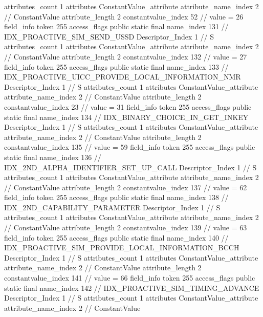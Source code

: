 {{{{{				attributes_count	1
				attributes {
				ConstantValue_attribute {
					attribute_name_index	2		// ConstantValue
					attribute_length	2
					constantvalue_index	52		// value = 26
				}
				}
			}
			field_info {
				token	255
				access_flags	public static final
				name_index	131		// IDX_PROACTIVE_SIM_SEND_USSD
				Descriptor_Index	1		// S
				attributes_count	1
				attributes {
				ConstantValue_attribute {
					attribute_name_index	2		// ConstantValue
					attribute_length	2
					constantvalue_index	132		// value = 27
				}
				}
			}
			field_info {
				token	255
				access_flags	public static final
				name_index	133		// IDX_PROACTIVE_UICC_PROVIDE_LOCAL_INFORMATION_NMR
				Descriptor_Index	1		// S
				attributes_count	1
				attributes {
				ConstantValue_attribute {
					attribute_name_index	2		// ConstantValue
					attribute_length	2
					constantvalue_index	23		// value = 31
				}
				}
			}
			field_info {
				token	255
				access_flags	public static final
				name_index	134		// IDX_BINARY_CHOICE_IN_GET_INKEY
				Descriptor_Index	1		// S
				attributes_count	1
				attributes {
				ConstantValue_attribute {
					attribute_name_index	2		// ConstantValue
					attribute_length	2
					constantvalue_index	135		// value = 59
				}
				}
			}
			field_info {
				token	255
				access_flags	public static final
				name_index	136		// IDX_2ND_ALPHA_IDENTIFIER_SET_UP_CALL
				Descriptor_Index	1		// S
				attributes_count	1
				attributes {
				ConstantValue_attribute {
					attribute_name_index	2		// ConstantValue
					attribute_length	2
					constantvalue_index	137		// value = 62
				}
				}
			}
			field_info {
				token	255
				access_flags	public static final
				name_index	138		// IDX_2ND_CAPABILITY_PARAMETER
				Descriptor_Index	1		// S
				attributes_count	1
				attributes {
				ConstantValue_attribute {
					attribute_name_index	2		// ConstantValue
					attribute_length	2
					constantvalue_index	139		// value = 63
				}
				}
			}
			field_info {
				token	255
				access_flags	public static final
				name_index	140		// IDX_PROACTIVE_SIM_PROVIDE_LOCAL_INFORMATION_BCCH
				Descriptor_Index	1		// S
				attributes_count	1
				attributes {
				ConstantValue_attribute {
					attribute_name_index	2		// ConstantValue
					attribute_length	2
					constantvalue_index	141		// value = 66
				}
				}
			}
			field_info {
				token	255
				access_flags	public static final
				name_index	142		// IDX_PROACTIVE_SIM_TIMING_ADVANCE
				Descriptor_Index	1		// S
				attributes_count	1
				attributes {
				ConstantValue_attribute {
					attribute_name_index	2		// ConstantValue
}}}}}}}

